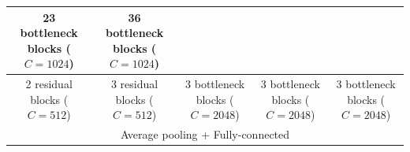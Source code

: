 \begin{table}[H]
\begin{tabular}{c|c|c|c|c}
            \makecell{23 bottleneck blocks\\($C=1024$)} & 
            \makecell{36 bottleneck blocks\\($C=1024$)} \\
        \midrule
            \makecell{2 residual blocks\\($C=512$)} & 
            \makecell{3 residual blocks\\($C=512$)} & 
            \makecell{3 bottleneck blocks\\($C=2048$)} & 
            \makecell{3 bottleneck blocks\\($C=2048$)} & 
            \makecell{3 bottleneck blocks\\($C=2048$)} \\
        \midrule
        \multicolumn{5}{c}{Average pooling + Fully-connected} \\
        \bottomrule
    \end{tabular}
\end{table}


